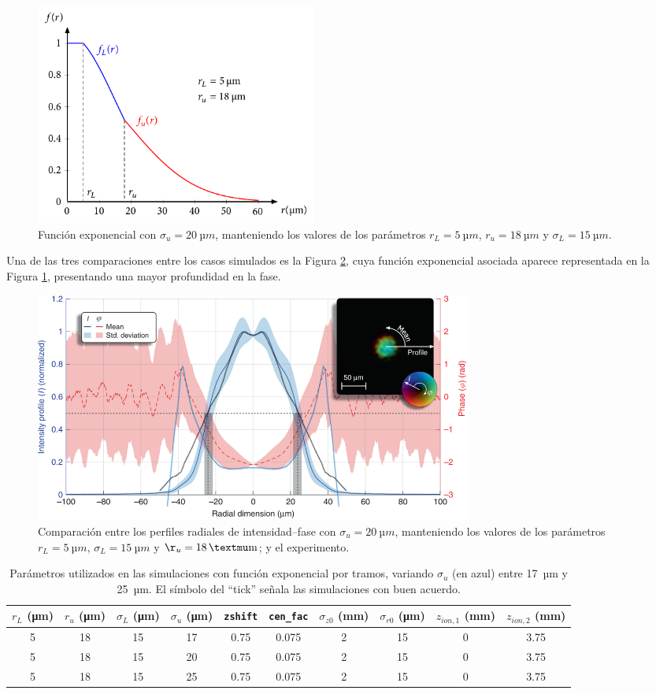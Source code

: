 \begin{figure}[htbp]
  \centering
  \includegraphics[width=0.45\textwidth]{Figuras/ch4_fexp2.pdf}
  \caption{Función exponencial con $\sigma_{u}=\qty{20}{µm}$, manteniendo los valores de los parámetros $r_{L}=\qty{5}{µm}$, $r_{u}=\qty{18}{µm}$ y $\sigma_{L}=\qty{15}{µm}$.}
  \label{fig:4.32}
\end{figure}

Una de las tres comparaciones entre los casos simulados es la Figura \ref{fig:4.33}, cuya función exponencial asociada aparece representada en la Figura \ref{fig:4.32}, presentando una mayor profundidad en la fase.

\begin{figure}[htbp]
  \centering
  \includegraphics[width=0.7\textwidth]{Figuras/ch4_cmp81.png}
  \caption{Comparación entre los perfiles radiales de intensidad--fase con $\sigma_{u}=\qty{20}{µm}$, manteniendo los valores de los parámetros $r_{L}=\qty{5}{µm}$, $\sigma_{L}=\qty{15}{µm}$ y $\r_{u}=\qty{18}{µm}$; y el experimento.}
  \label{fig:4.33}
\end{figure}

\begin{table}[htpb]
  \centering
  \scriptsize
  \caption{Parámetros utilizados en las simulaciones con función exponencial por tramos, variando $\sigma_{u}$ (en azul) entre \qty{17}{µm} y \qty{25}{µm}. El símbolo del \enquote{tick} señala las simulaciones con buen acuerdo.}
  \label{tab:4.10}
  \begin{tabular}{SSS>{\color{miazul}}SSSSSSS}
  \toprule
  {$r_{L}$ (\unit{\um})} & {$r_{u}$ (\unit{\um})} & {$\sigma_{L}$ (\unit{\um})} & {$\sigma_{u}$ (\unit{\um})} & {\texttt{zshift}} & {\texttt{cen\_fac}} & {$\sigma_{z0}$ (\unit{mm})} & {$\sigma_{r0}$ (\unit{\um})} & {$z_{ion,1}$ (\unit{mm})} & {$z_{ion,2}$ (\unit{mm})} \\ 
    & 18  & 15 & 17  & 0.75  & 0.075  & 2  & 15  & 0  & 3.75  \\
  5  & 18  & 15 & 20  & 0.75  & 0.075  & 2  & 15  & 0  & 3.75  \\
  5  & 18  & 15 & 25  & 0.75  & 0.075  & 2  & 15  & 0  & 3.75  \\
  \bottomrule
  \end{tabular}
\end{table}

